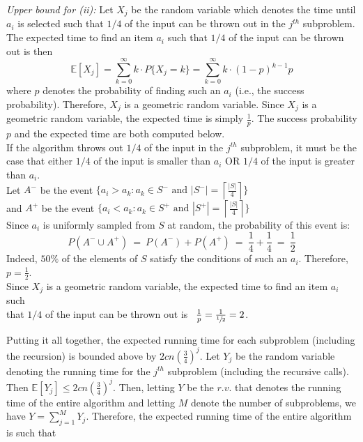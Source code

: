 \documentclass[twoside,11pt]{homework}
\begin{document}
\begin{enumerate}[\bf (a)]
\noindent
\textit{Upper bound for (ii):} Let $X_j$ be the random variable which denotes the time until $a_i$ is selected such that $1/4$ of the input can be thrown out in the $j^{th}$ subproblem.  The expected time to find an item $a_i$ such that $1/4$ of the input can be thrown out is then 
$$\mathbb{E}\left[ X_j \right] = \sum_{k=0}^{\infty} k \cdot P\{X_j = k \} = \sum_{k=0}^{\infty} k \cdot (1 - p)^{k-1} p$$
where $p$ denotes the probability of finding such an $a_i$ (i.e., the success probability).  Therefore,  $X_j$ is a geometric random variable.  Since $X_j$ is a geometric random variable, the expected time is simply $\frac{1}{p}$.  The success probability $p$ and the expected time are both computed below. \\

\noindent
If the algorithm throws out $1/4$ of the input in the $j^{th}$ subproblem,  it must be the case that either $1/4$ of the input is smaller than $a_i$ OR $1/4$ of the input is greater than $a_i$.   \\
Let $A^-$ be the event $\{a_i > a_k : a_k \in S^- \textrm{ and } |S^-| = \left\lceil \frac{|S|}{4} \right\rceil \}$\\[0.3em]
and $A^+$ be the event $\{a_i < a_k : a_k \in S^+ \textrm{ and } |S^+| = \left\lceil \frac{|S|}{4} \right\rceil \}$ \\[0.3em]
Since $a_i$ is uniformly sampled from $S$ at random,  the probability of this event is: 
$$P\left(A^- \cup A^+\right) \ = \ P\left(A^-\right) + P\left(A^+\right) \ = \ \frac{1}{4} + \frac{1}{4} \ = \  \frac{1}{2}$$
Indeed,  $50\%$ of the elements of $S$ satisfy the conditions of such an $a_i$.  Therefore,  $p = \frac{1}{2}$.   \\[0.5em]
Since $X_j$ is a geometric random variable, the expected time to find an item $a_i$ such \\[0.3em]
that $1/4$ of the input can be thrown out is \ $\frac{1}{p} = \frac{1}{\sfrac{1}{2}} = 2$. 

Putting it all together,  the expected running time for each subproblem (including the recursion) is bounded above by 
$2cn\left(\frac{3}{4}\right)^j$.  Let $Y_j$ be the random variable denoting the running time for the $j^{th}$ subproblem (including the recursive calls).  Then $\mathbb{E}\left[ Y_j \right] \leq 2cn\left(\frac{3}{4}\right)^j$.  Then,  letting $Y$ be the $r.v. $ that denotes the running time of the entire algorithm and letting $M$ denote the number of subproblems,  we have $Y = \sum_{j=1}^{M} Y_j$. Therefore, the expected running time of the entire algorithm is such that


\end{enumerate}
\end{document}
